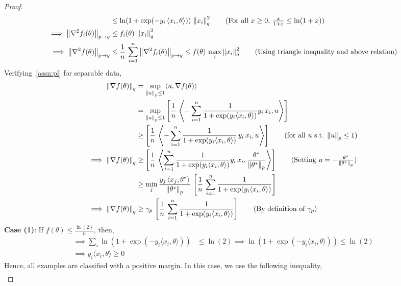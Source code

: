 \documentclass{article}
\newcommand{\normsq}[1]{\left\|#1 \right\|^{2}}
\newcommand{\norm}[1]{\left\|#1 \right\|}
\begin{document}
\begin{proof}
\begin{align*}
& \leq \ln(1 + \exp(-y_i \, \langle x_i, \theta \rangle)) \,   \normsq{x_i}_{q}  \tag{For all $x\geq 0$, $\frac{x}{1+x} \leq \ln(1+x)$} \\
\implies \norm{\nabla^2 f_i(\theta)}_{p \to q} & \leq  f_i(\theta) \,  \normsq{x_i}_{q} \\
\implies \norm{\nabla^2 f(\theta)}_{p \to q} & \leq \frac{1}{n} \,\sum_{i = 1}^{n} \norm{\nabla^2 f_i(\theta)}_{p \to q} \leq f(\theta) \, \max_i \normsq{x_i}_q \tag{Using triangle inequality and above relation} 
\end{align*} 
Verifying~\cref{assn:pl} for separable data, 
\begin{align*}
\norm{\nabla f(\theta)}_q &= \sup_{\norm{u}_p \leq 1} \langle u, \nabla f(\theta) \rangle \\  
& = \sup_{\norm{u}_p \leq 1} \left[ \frac{1}{n} \, \left\langle -\sum_{i = 1}^{n} \frac{1}{1 + \exp(y_i \langle x_i, \theta \rangle)} y_i \, x_i, u \right \rangle \right] \\
& \geq \left[ \frac{1}{n} \, \left\langle -\sum_{i = 1}^{n} \frac{1}{1 + \exp(y_i \langle x_i, \theta \rangle)} \, y_i \, x_i, u \right \rangle \right] \tag{for all $u$ s.t. $\norm{u}_p \leq 1$} \\
\implies \norm{\nabla f(\theta)}_q & \geq \left[ \frac{1}{n} \, \left\langle \sum_{i = 1}^{n} \frac{1}{1 + \exp(y_i \langle x_i, \theta \rangle)} y_i \, x_i, \frac{\theta^*}{\norm{\theta^*}_p} \right \rangle \right] \tag{Setting $u = -\frac{\theta^*}{\norm{\theta^*}_p}$} \\
& \geq \min_{j} \frac{y_j \, \langle x_j, \theta^* \rangle}{\norm{\theta^*}_p} \, \left[ \frac{1}{n} \, \sum_{i = 1}^{n} \frac{1}{1 + \exp(y_i \langle x_i, \theta \rangle)} \right] \\
\implies \norm{\nabla f(\theta)}_q & \geq \gamma_p \, \left[ \frac{1}{n} \, \sum_{i = 1}^{n} \frac{1}{1 + \exp(y_i \langle x_i, \theta \rangle)} \right] \tag{By definition of $\gamma_p$}
\end{align*}
\textbf{Case (1)}: If $f(\theta) \leq \frac{\ln(2)}{n}$, then, 
\begin{align*}
\implies \sum_i \ln(1 + \exp(-y_i \langle x_i, \theta \rangle) ) & \leq \ln(2) \implies \ln(1 + \exp(-y_i \langle x_i, \theta \rangle) ) \leq \ln(2) \tag{Since $f_i(\theta) > 0$} \\
\implies y_i \langle x_i, \theta \rangle \geq 0
\end{align*}
Hence, all examples are classified with a positive margin. In this case, we use the following inequality, 
\begin{align*}

\end{align*}
\end{proof}
\end{document}
